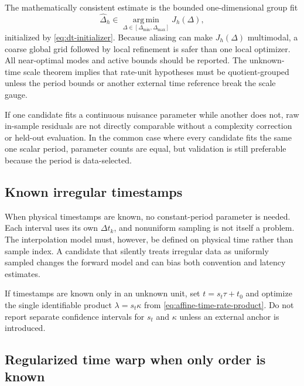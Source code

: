 \documentclass[11pt]{article}
\newcommand{\argmin}{\operatorname*{arg\,min}}
\begin{document}
    The mathematically consistent estimate is the bounded one-dimensional group fit
    \begin{equation}
        \widehat\Delta_h
        \in\argmin_{\Delta\in[\Delta_{\min},\Delta_{\max}]}J_h(\Delta),
    \end{equation}
    initialized by \eqref{eq:dt-initializer}. Because aliasing can make $J_h(\Delta)$
    multimodal, a coarse global grid followed by local refinement is safer than one local
    optimizer. All near-optimal modes and active bounds should be reported. The unknown-time
    scale theorem implies that rate-unit hypotheses must be quotient-grouped unless the
    period bounds or another external time reference break the scale gauge.

    If one candidate fits a continuous nuisance parameter while another does not, raw
    in-sample residuals are not directly comparable without a complexity correction or
    held-out evaluation. In the common case where every candidate fits the same one scalar
    period, parameter counts are equal, but validation is still preferable because the
    period is data-selected.

    \subsection{Known irregular timestamps}

    When physical timestamps are known, no constant-period parameter is needed. Each
    interval uses its own $\Delta t_k$, and nonuniform sampling is not itself a problem. The
    interpolation model must, however, be defined on physical time rather than sample index.
    A candidate that silently treats irregular data as uniformly sampled changes the forward
    model and can bias both convention and latency estimates.

    If timestamps are known only in an unknown unit, set $t=s_t\tau+t_0$ and optimize the single
    identifiable product $\lambda=s_t\kappa$ from
    \eqref{eq:affine-time-rate-product}. Do not report separate confidence intervals for $s_t$
    and $\kappa$ unless an external anchor is introduced.

    \subsection{Regularized time warp when only order is known}
\end{document}
